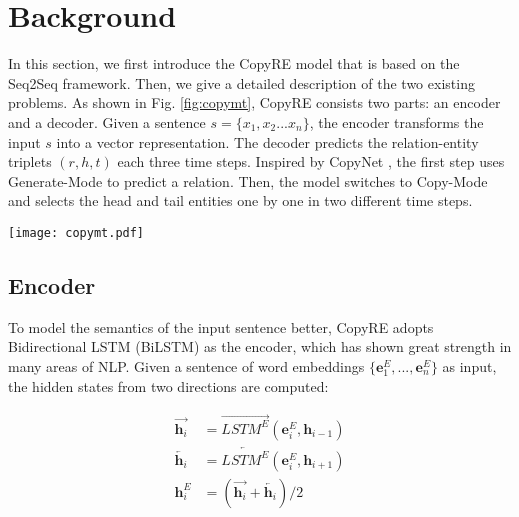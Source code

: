\documentclass[letterpaper]{article} \usepackage{aaai20}  \usepackage{times}  \usepackage{helvet} \usepackage{courier}  \usepackage[hyphens]{url}  \usepackage{graphicx}
\begin{document}
  


  


  
  
  \section{Background}
  \label{background}    
      
      In this section, we first introduce the CopyRE model that is based on the Seq2Seq framework. 
      Then, we give a detailed description of the two existing problems.
      As shown in Fig. \ref{fig:copymt}, CopyRE consists two parts: an encoder and a decoder.
      Given a sentence $s=\{x_1,x_2...x_n\}$, the encoder transforms the input $s$ into a vector representation. 
      The decoder predicts the relation-entity triplets $(r, h, t)$ each three time steps. 
      Inspired by CopyNet \cite{CopyNet}, the first step uses Generate-Mode to predict a relation. 
      Then, the model switches to Copy-Mode and selects the head and tail entities one by one in two different time steps.




      \begin{figure*}[t]
          \centering
          \texttt{[image: copymt.pdf]}
          \caption{The overview of CopyMTL model for joint extraction of relation and entity. The CopyRE model does not contain the CopyMTL-Tagging part, i.e., the sequence-labeling part in the figure.}
          \label{fig:copymt}
      \end{figure*}
      
      \subsection{Encoder}
      
      To model the semantics of the input sentence better, CopyRE adopts Bidirectional LSTM (BiLSTM) \cite{bilstm} as the encoder, which has shown great strength in many areas of NLP. Given a sentence of word embeddings $\{\bm{e}^E_1,...,\bm{e}^E_n\}$ as input, the hidden states from two directions are computed:
      

      \begin{equation}
      \begin{split}
      \overrightarrow{\bm{h}_i} &= \overrightarrow{LSTM^E}(\bm{e}^E_i, \bm{h}_{i-1}) \\
      \overleftarrow{\bm{h}_i} &= \overleftarrow{LSTM^E}(\bm{e}^E_i, \bm{h}_{i+1})\\
      \bm{h}^E_i &= (\overrightarrow{\bm{h}_i}+\overleftarrow{\bm{h}_i})/2
      \label{eq:encoder}
      \end{split}
      \end{equation}
\end{document}
